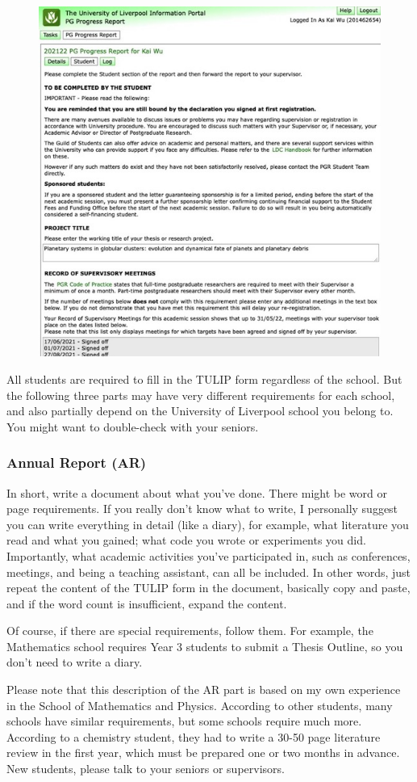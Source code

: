 \begin{figure}[H]
    \includegraphics[width=0.7\columnwidth, center]{author-folder/Kai.Wu/TULIP.jpg}
\end{figure}

All students are required to fill in the TULIP form regardless of the school. But the following three parts may have very different requirements for each school, and also partially depend on the University of Liverpool school you belong to. You might want to double-check with your seniors.

\subsubsection{Annual Report (AR)}
In short, write a document about what you've done. There might be word or page requirements. If you really don't know what to write, I personally suggest you can write everything in detail (like a diary), for example, what literature you read and what you gained; what code you wrote or experiments you did. Importantly, what academic activities you've participated in, such as conferences, meetings, and being a teaching assistant, can all be included. In other words, just repeat the content of the TULIP form in the document, basically copy and paste, and if the word count is insufficient, expand the content.

Of course, if there are special requirements, follow them. For example, the Mathematics school requires Year 3 students to submit a Thesis Outline, so you don't need to write a diary.

Please note that this description of the AR part is based on my own experience in the School of Mathematics and Physics. According to other students, many schools have similar requirements, but some schools require much more. According to a chemistry student, they had to write a 30-50 page literature review in the first year, which must be prepared one or two months in advance. New students, please talk to your seniors or supervisors.

